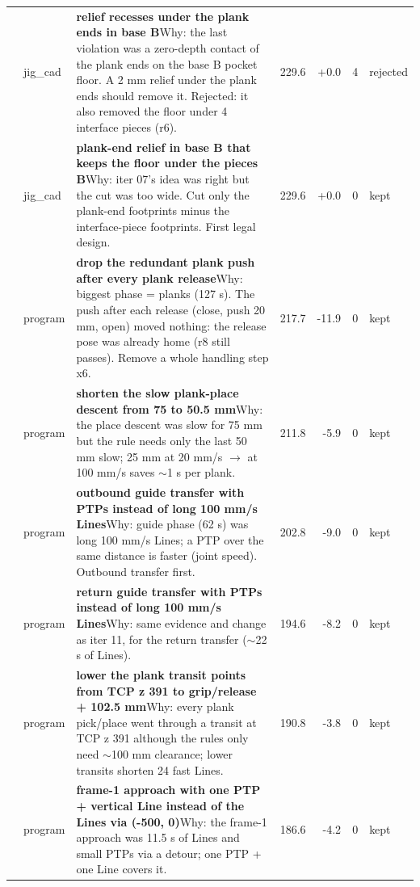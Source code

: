 {\begin{longtable}{>{\raggedleft}p{5mm} p{12mm} >{\raggedright}p{85mm} r r r p{14mm}}
7 & jig\_cad & \textbf{relief recesses under the plank ends in base B}\newline Why: the last violation was a zero-depth contact of the plank ends on the base B pocket floor. A 2 mm relief under the plank ends should remove it. Rejected: it also removed the floor under 4 interface pieces (r6). & 229.6 & +0.0 & 4 & rejected \\
8 & jig\_cad & \textbf{plank-end relief in base B that keeps the floor under the pieces B}\newline Why: iter 07's idea was right but the cut was too wide. Cut only the plank-end footprints minus the interface-piece footprints. First legal design. & 229.6 & +0.0 & 0 & kept \\
9 & program & \textbf{drop the redundant plank push after every plank release}\newline Why: biggest phase = planks (127 s). The push after each release (close, push 20 mm, open) moved nothing: the release pose was already home (r8 still passes). Remove a whole handling step x6. & 217.7 & -11.9 & 0 & kept \\
10 & program & \textbf{shorten the slow plank-place descent from 75 to 50.5 mm}\newline Why: the place descent was slow for 75 mm but the rule needs only the last 50 mm slow; 25 mm at 20 mm/s $\to$ at 100 mm/s saves $\sim$1 s per plank. & 211.8 & -5.9 & 0 & kept \\
11 & program & \textbf{outbound guide transfer with PTPs instead of long 100 mm/s Lines}\newline Why: guide phase (62 s) was long 100 mm/s Lines; a PTP over the same distance is faster (joint speed). Outbound transfer first. & 202.8 & -9.0 & 0 & kept \\
12 & program & \textbf{return guide transfer with PTPs instead of long 100 mm/s Lines}\newline Why: same evidence and change as iter 11, for the return transfer ($\sim$22 s of Lines). & 194.6 & -8.2 & 0 & kept \\
13 & program & \textbf{lower the plank transit points from TCP z 391 to grip/release + 102.5 mm}\newline Why: every plank pick/place went through a transit at TCP z 391 although the rules only need $\sim$100 mm clearance; lower transits shorten 24 fast Lines. & 190.8 & -3.8 & 0 & kept \\
14 & program & \textbf{frame-1 approach with one PTP + vertical Line instead of the Lines via (-500, 0)}\newline Why: the frame-1 approach was 11.5 s of Lines and small PTPs via a detour; one PTP + one Line covers it. & 186.6 & -4.2 & 0 & kept \\

\end{longtable}}
